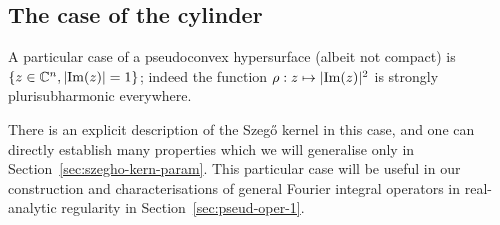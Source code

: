 \documentclass[AHL,Unicode,longabstracts,published]{cedram}
\makeatletter
\DeclareMathOperator{\diag}{diag}
\DeclareMathOperator{\im}{Im}
\newcommand\1{\mathds{1}}
\newcommand{\R}{\mathbb{R}}
\newcommand{\C}{\mathbb{C}}
\newcommand{\dd}{\mathrm{d}}
\let\save@mathaccent\mathaccent
\newcommand*\if@single[3]{%
  \setbox0\hbox{${\mathaccent"0362{#1}}^H$}%
  \setbox2\hbox{${\mathaccent"0362{\kern0pt#1}}^H$}%
  \ifdim\ht0=\ht2 #3\else #2\fi
  }
\newcommand*\rel@kern[1]{\kern#1\dimexpr\macc@kerna}
\newcommand*\widebar[1]{\@ifnextchar^{{\wide@bar{#1}{0}}}{\wide@bar{#1}{1}}}
\newcommand*\wide@bar[2]{\if@single{#1}{\wide@bar@{#1}{#2}{1}}{\wide@bar@{#1}{#2}{2}}}
\newcommand*\wide@bar@[3]{%
  \begingroup
  \def\mathaccent##1##2{%
    \let\mathaccent\save@mathaccent
    \if#32 \let\macc@nucleus\first@char \fi
    \setbox\z@\hbox{$\macc@style{\macc@nucleus}_{}$}%
    \setbox\tw@\hbox{$\macc@style{\macc@nucleus}{}_{}$}%
    \dimen@\wd\tw@
    \advance\dimen@-\wd\z@
    \divide\dimen@ 3
    \@tempdima\wd\tw@
    \advance\@tempdima-\scriptspace
    \divide\@tempdima 10
    \advance\dimen@-\@tempdima
    \ifdim\dimen@>\z@ \dimen@0pt\fi
    \rel@kern{0.6}\kern-\dimen@
    \if#31
      \overline{\rel@kern{-0.6}\kern\dimen@\macc@nucleus\rel@kern{0.4}\kern\dimen@}%
      \advance\dimen@0.4\dimexpr\macc@kerna
      \let\final@kern#2%
      \ifdim\dimen@<\z@ \let\final@kern1\fi
      \if\final@kern1 \kern-\dimen@\fi
    \else
      \overline{\rel@kern{-0.6}\kern\dimen@#1}%
    \fi
  }%
  \macc@depth\@ne
  \let\math@bgroup\@empty \let\math@egroup\macc@set@skewchar
  \mathsurround\z@ \frozen@everymath{\mathgroup\macc@group\relax}%
  \macc@set@skewchar\relax
  \let\mathaccentV\macc@nested@a
  \if#31
    \macc@nested@a\relax111{#1}%
  \else
    \def\gobble@till@marker##1\endmarker{}%
    \futurelet\first@char\gobble@till@marker#1\endmarker
    \ifcat\noexpand\first@char A\else
      \def\first@char{}%
    \fi
    \macc@nested@a\relax111{\first@char}%
  \fi
  \endgroup
}
\let\oldbar\bar
\renewcommand*{\bar}[1]{{\mathchoice{\widebar{#1}}{\widebar{#1}}{\widebar{#1}}{\oldbar{#1}}}}
\let\oldmapsto\mapsto
\renewcommand*{\mapsto}{\mathchoice{\longmapsto}{\oldmapsto}{\oldmapsto}{\oldmapsto}}
\makeatother
\begin{document}
\subsection{The case of the cylinder}\label{sec:an-exampl-eucl}

A particular case of a pseudoconvex hypersurface (albeit not compact) is $\{z\in \C^n,\linebreak \lvert\im(z)|=1\}$; indeed the function $\rho:z\mapsto \lvert\im(z)|^2$ is strongly plurisubharmonic everywhere.

There is an explicit description of the Szeg\H{o} kernel in this case, and one can directly establish many properties which we will generalise only in Section~\ref{sec:szegho-kern-param}. This particular case will be useful in our construction and characterisations of general {Fourier integral operators} in real-analytic regularity in Section~\ref{sec:pseud-oper-1}.

\end{document}
